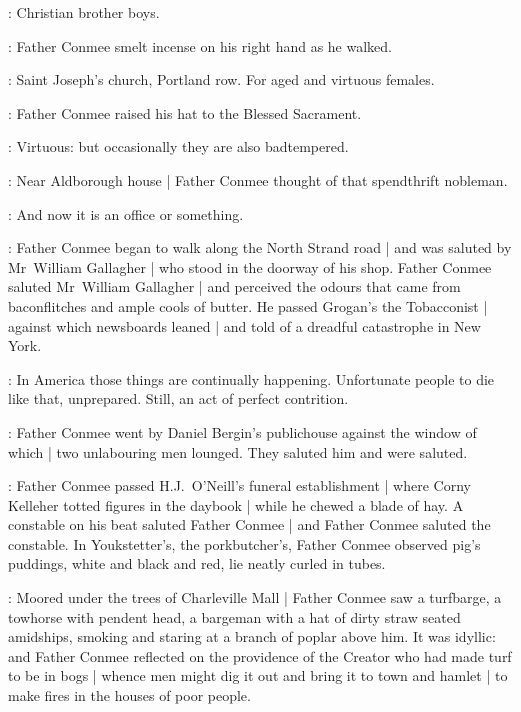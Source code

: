 \conmeeint:
Christian brother boys.

:
Father Conmee smelt incense on his right hand as he walked.

\conmeeint:
Saint Joseph's church, Portland row.%
For aged and virtuous females.

:
Father Conmee raised his hat to the Blessed Sacrament.

\conmeeint:
Virtuous: but occasionally they are also badtempered.

:
Near Aldborough house |
Father Conmee thought of that spendthrift nobleman.

\conmeeint:
And now it is an office or something.

:
Father Conmee began to walk along the North Strand road |
and was saluted by Mr~William Gallagher |
who stood in the doorway of his shop.
Father Conmee saluted Mr~William Gallagher |
and perceived the odours
that came from bacon\-flitches and ample cools of butter.
He passed Grogan's the Tobacconist |
against which newsboards leaned |
and told of a dreadful catastrophe%
in New York.

\conmeeint:
In America those things are continually happening.
Unfortunate people to die like that, unprepared.
Still, an act of perfect contrition.

:
Father Conmee went by Daniel Bergin's publichouse
against the window of which |
two unlabouring men lounged.
They saluted him and were saluted.

\begin{interject}
    :
    Father Conmee passed H.J.~O'Neill's funeral establishment |
    where Corny Kelleher totted figures in the daybook |
    while he chewed a blade of hay.
    A constable on his beat saluted Father Conmee |
    and Father Conmee saluted the constable.
    In Youkstetter's, the porkbutcher's,
    Father Conmee observed pig's puddings,
    white and black and red,
    lie neatly curled in tubes.
\end{interject}%

:
Moored under the trees of Charleville Mall |
Father Conmee saw a turfbarge,
a towhorse with pendent head,
a bargeman with a hat of dirty straw seated amidships,
smoking and staring at a branch of poplar above him.
It was idyllic:
and Father Conmee reflected on the providence of the Creator
who had made turf to be in bogs |
whence men might dig it out and bring it to town and hamlet |
to make fires in the houses of poor people.

